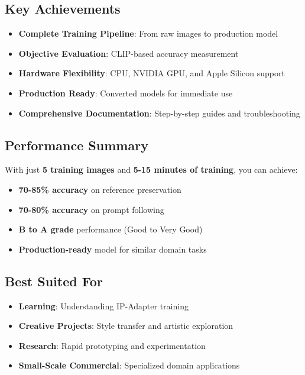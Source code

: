 \documentclass[11pt,a4paper]{article}
\begin{document}
\subsection{Key Achievements}

\begin{itemize}
    \item  \textbf{Complete Training Pipeline}: From raw images to production model
    \item  \textbf{Objective Evaluation}: CLIP-based accuracy measurement
    \item  \textbf{Hardware Flexibility}: CPU, NVIDIA GPU, and Apple Silicon support
    \item  \textbf{Production Ready}: Converted models for immediate use
    \item  \textbf{Comprehensive Documentation}: Step-by-step guides and troubleshooting
\end{itemize}

\subsection{Performance Summary}

With just \textbf{5 training images} and \textbf{5-15 minutes of training}, you can achieve:
\begin{itemize}
    \item \textbf{70-85\% accuracy} on reference preservation
    \item \textbf{70-80\% accuracy} on prompt following
    \item \textbf{B to A grade} performance (Good to Very Good)
    \item \textbf{Production-ready} model for similar domain tasks
\end{itemize}

\subsection{Best Suited For}

\begin{itemize}
    \item  \textbf{Learning}: Understanding IP-Adapter training
    \item  \textbf{Creative Projects}: Style transfer and artistic exploration
    \item  \textbf{Research}: Rapid prototyping and experimentation
    \item  \textbf{Small-Scale Commercial}: Specialized domain applications
\end{itemize}
\end{document}
